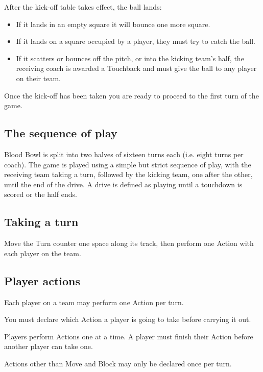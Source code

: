 \begin{multicols}{2}
\par After the kick-off table takes effect, the ball lands:
\begin{itemize}
\item If it lands in an empty square it will bounce one more square.
\item If it lands on a square occupied by a player, they must try to catch the ball.
\item If it scatters or bounces off the pitch, or into the kicking team's half, the receiving coach is awarded a Touchback and must give the ball to any player on their team. 
\end{itemize}
\par Once the kick-off has been taken you are ready to proceed to the first turn of the game.

\subsection{The sequence of play}
\par Blood Bowl is split into two halves of sixteen turns each (i.e. eight turns per coach). The game is played using a simple but strict sequence of play, with the receiving team taking a turn, followed by the kicking team, one after the other, until the end of the drive. A drive is defined as playing until a touchdown is scored or the half ends.

\subsection{Taking a turn}
\par Move the Turn counter one space along its track, then perform one Action with each player on the team.

\subsection{Player actions}
\par Each player on a team may perform one Action per turn.
\par You must declare which Action a player is going to take before carrying it out.
\par Players perform Actions one at a time. A player must finish their Action before another player can take one.
\par Actions other than Move and Block may only be declared once per turn.


\end{multicols}
